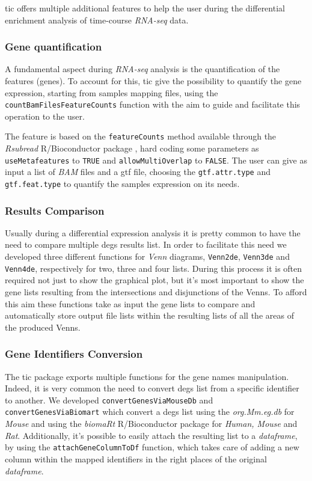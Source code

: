 \gls{tic} offers multiple additional features to help the user during the differential enrichment analysis of time-course \textit{RNA-seq} data.

\subsubsection{Gene quantification}

A fundamental aspect during \textit{RNA-seq} analysis is the quantification of the features (genes).
To account for this, \gls{tic} give the possibility to quantify the gene expression, starting from samples mapping files, using the \lstinline!countBamFilesFeatureCounts! function with the aim to guide and facilitate this operation to the user.

The feature is based on the \lstinline!featureCounts! method available through the \textit{Rsubread} R/Bioconductor package \cite{Liao2013}, hard coding some parameters as \lstinline!useMetafeatures! to \lstinline!TRUE! and \lstinline!allowMultiOverlap! to \lstinline!FALSE!.
The user can give as input a list of \textit{BAM} files and a \gls{gtf} file, choosing  the \lstinline!gtf.attr.type! and \lstinline!gtf.feat.type! to quantify the samples expression on its needs.

\subsubsection{Results Comparison}

Usually during a differential expression analysis it is pretty common to have the need to compare multiple \glspl{deg} results list.
In order to facilitate this need we developed three different functions for \textit{Venn} diagrams, \lstinline!Venn2de!, \lstinline!Venn3de! and \lstinline!Venn4de!, respectively for two, three and four lists.
During this process it is often required not just to show the graphical plot, but it's most important to show the gene lists resulting from the intersections and disjunctions of the Venns.
To afford this aim these functions take as input the gene lists to compare and automatically store output file lists within the resulting lists of all the areas of the produced Venns.

\subsubsection{Gene Identifiers Conversion}

The \gls{tic} package exports multiple functions for the gene names manipulation. 
Indeed, it is very common the need to convert \glspl{deg} list from a specific identifier to another.
We developed \lstinline!convertGenesViaMouseDb! and \lstinline!convertGenesViaBiomart! which convert a \glspl{deg} list using the \textit{org.Mm.eg.db} \cite{Carlson2018} for \textit{Mouse} and using the \textit{biomaRt} R/Bioconductor package for \textit{Human, Mouse} and \textit{Rat}.
Additionally, it's possible to easily attach the resulting list to a \textit{dataframe}, by using the \lstinline!attachGeneColumnToDf! function, which takes care of adding a new column within the mapped identifiers in the right places of the original \textit{dataframe}.

